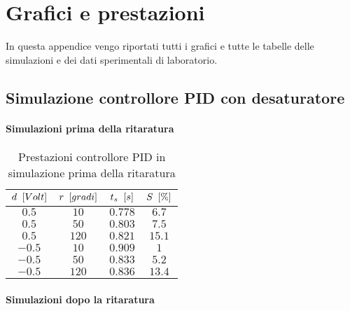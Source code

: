 \section{Grafici e prestazioni}
\label{app:grafici}

	In questa appendice vengo riportati tutti i grafici e tutte le tabelle delle simulazioni e dei dati sperimentali di laboratorio.
	
	\subsection{Simulazione controllore PID con desaturatore}
	\label{subapp:PIDsimulazione}
	
		\paragraph{Simulazioni prima della ritaratura}
		
			\begin{center}
				 
			\end{center}	
			
			\begin{center}
				 
			\end{center}
			
			\begin{table}[H]
				\centering
				\begin{tabular}{cccc}
					\toprule
					\textbf{$d \singleSpacing [Volt]$} & \textbf{$r \singleSpacing [gradi]$} & \textbf{$t_s \singleSpacing [s]$} & \textbf{$S \singleSpacing [\%]$}\\
					\midrule
					$0.5$   & $10$  & $0.778$ & $6.7$    \\
					$0.5$   & $50$  & $0.803$ & $7.5$    \\
					$0.5$   & $120$ & $0.821$ & $15.1$   \\
					$-0.5$  & $10$  & $0.909$ & $1$      \\
					$-0.5$  & $50$  & $0.833$ & $5.2$    \\ 	
					$-0.5$  & $120$ & $0.836$ & $13.4$   \\ 
					\bottomrule
				\end{tabular}
				\caption{Prestazioni controllore PID in simulazione prima della ritaratura}
				\label{tab:PIDsim}
			\end{table}		
		
		\newpage	
		\paragraph{Simulazioni dopo la ritaratura}		
		
